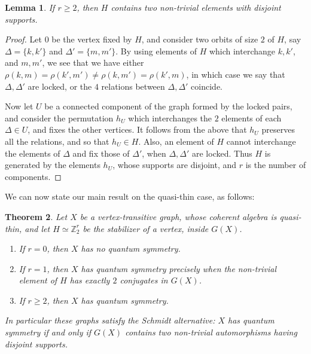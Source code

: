 \documentclass[11pt]{amsart}
\newtheorem{theorem}{Theorem}[section]
\newtheorem{lemma}[theorem]{Lemma}
\newcommand{\Z}{\mathbb Z}
\begin{document}
\begin{lemma}
If $r\geq2$, then $H$ contains two non-trivial elements with disjoint supports.
\end{lemma}

\begin{proof}
Let $0$ be the vertex fixed by $H$, and consider two orbits of size $2$ of $H$, say $\Delta=\{k,k'\}$ and $\Delta'=\{m,m'\}$. By using elements of $H$ which interchange $k,k'$, and $m,m'$, we see that we have either $\rho(k,m)=\rho(k',m')\neq\rho(k,m')=\rho(k',m)$, in which case we say that $\Delta,\Delta'$ are locked, or the $4$ relations between $\Delta,\Delta'$ coincide.

Now let $U$ be a connected component of the graph formed by the locked pairs, and consider the permutation $h_U$ which interchanges the $2$ elements of each $\Delta\in U$, and fixes the other vertices. It follows from the above that $h_U$ preserves all the relations, and so that $h_U\in H$. Also, an element of $H$ cannot interchange the elements of $\Delta$ and fix those of $\Delta'$, when $\Delta,\Delta'$ are locked. Thus $H$ is generated by the elements $h_U$, whose supports are disjoint, and $r$ is the number of components.
\end{proof}

We can now state our main result on the quasi-thin case, as follows:

\begin{theorem}
Let $X$ be a vertex-transitive graph, whose coherent algebra is quasi-thin, and let $H\simeq\Z_2^r$ be the stabilizer of a vertex, inside $G(X)$.
\begin{enumerate}
\item If $r=0$, then $X$ has no quantum symmetry.
\item If $r=1$, then $X$ has quantum symmetry precisely when the non-trivial element of $H$ has exactly $2$ conjugates in $G(X)$.
\item If $r\geq2$, then $X$ has quantum symmetry.
\end{enumerate}
In particular these graphs satisfy the Schmidt alternative: $X$ has quantum symmetry if and only if $G(X)$ contains two non-trivial automorphisms having disjoint supports.
\end{theorem}
\end{document}
